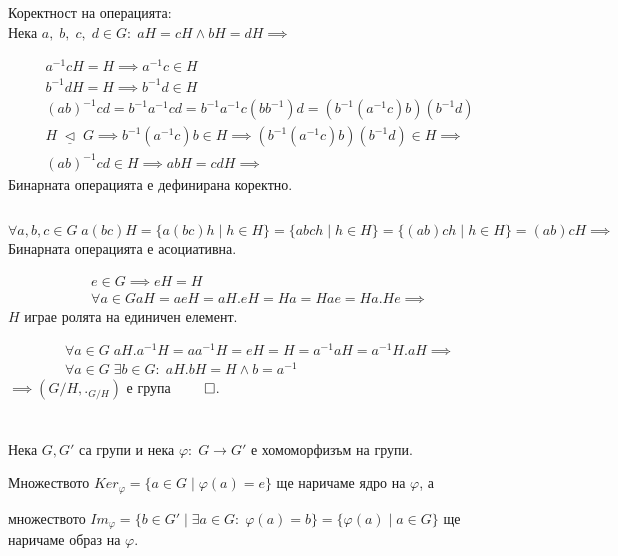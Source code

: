 \documentclass{article}
\newcommand{\NSG}{\; \underline{\triangleleft} \;}
\begin{document}
Коректност на операцията: \\
Нека $a, \; b, \; c, \; d \in G : \; aH = cH \land bH = dH \implies$

\begin{align*}
	a^{-1}cH = H \implies a^{-1}c \in H \\
	b^{-1}dH = H \implies b^{-1}d \in H \\
	(ab)^{-1}cd = b^{-1}a^{-1}cd = b^{-1}a^{-1}c(bb^{-1})d = (b^{-1}(a^{-1}c)b)(b^{-1}d) \\
	H \NSG G \implies b^{-1}(a^{-1}c)b \in H \implies (b^{-1}(a^{-1}c)b)(b^{-1}d) \in H \implies \\
	(ab)^{-1}cd \in H \implies abH = cdH \implies
\end{align*}
Бинарната операцията е дефинирана коректно.

\subsection*{}
$\forall a, b, c \in G \; a(bc)H = \{a(bc)h \; | \; h \in H\} = \{abch \; | \; h \in H\} = \{(ab)ch \; | \; h \in H\} = (ab)cH \implies$ \\
Бинарната операцията е асоциативна.

\begin{align*}
	e \in G \implies eH = H \\
	\forall a \in G aH = aeH = aH.eH = Ha = Hae = Ha.He \implies 
\end{align*}
$H$ играе ролята на единичен елемент.

\begin{align*}
	\forall a \in G \; aH.a^{-1}H = aa^{-1}H = eH = H = a^{-1}aH = a^{-1}H.aH \implies \\
	\forall a \in G \; \exists b \in G : \; aH.bH = H \land b = a^{-1}
\end{align*}
$\implies (G/H, ._{G/H})$ е група $\qed$.

\section*{}

Нека $G, G'$ са групи и нека $\varphi : \; G \to G'$ е хомоморфизъм на групи.

Множеството $Ker_\varphi = \{a \in G \; | \; \varphi(a) = e\}$ ще наричаме ядро на $\varphi$, а

множеството $Im_\varphi = \{b \in G' \; | \; \exists a \in G : \; \varphi(a) = b \} = \{\varphi(a) \; | \; a \in G\}$ ще наричаме образ на $\varphi$.
\end{document}
